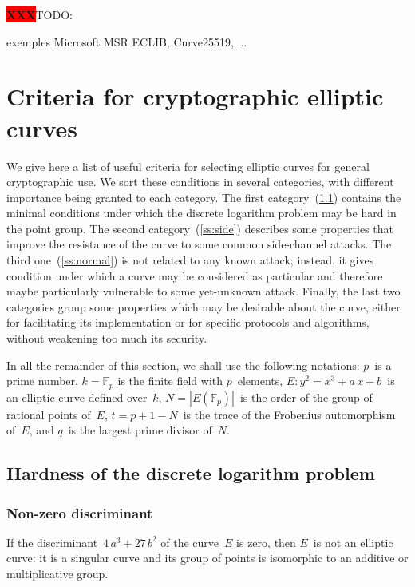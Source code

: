 \documentclass{article}
\def\F{\mathbb{F}}
\def\abs#1{\left|#1\right|}
\def\XXX{{\colorbox{red}{{\color{white}\bfseries XXX}}}}
\begin{document}
\sloppy

\XXX TODO:

exemples Microsoft MSR ECLIB, Curve25519, ...

\section{Criteria for cryptographic elliptic curves}
\label{s:criteria}

We give here a list of useful criteria for selecting elliptic curves
for general cryptographic use.
We sort these conditions in several categories,
with different importance being granted to each category.
The first category~(\ref{ss:dlp}) contains the minimal conditions under which
the discrete logarithm problem may be hard in the point group.
The second category~(\ref{ss:side}) describes some properties that improve
the resistance of the curve to some common side-channel attacks.
The third one~(\ref{ss:normal}) is not related to any known attack;
instead, it gives condition under which a curve may be considered
as particular and therefore maybe particularly vulnerable
to some yet-unknown attack.
Finally, the last two categories group some properties
which may be desirable about the curve,
either for facilitating its implementation
or for specific protocols and algorithms,
without weakening too much its security.

In all the remainder of this section,
we shall use the following notations:
$p$~is a prime number,
$k = \F_{p}$ is the finite field with $p$~elements,
$E: y^2 = x^3 + a\,x + b$~is an elliptic curve defined over~$k$,
$N = \abs{E(\F_p)}$~is the order of the group of rational points of~$E$,
$t = p + 1 - N$~is the trace of the Frobenius automorphism of~$E$,
and $q$~is the largest prime divisor of~$N$.


\subsection{Hardness of the discrete logarithm problem}
\label{ss:dlp}
\subsubsection{Non-zero discriminant}

If the discriminant~$4\, a^3 + 27\,b^2$
of the curve~$E$ is zero, then $E$~is not an elliptic curve:
it is a singular curve and its group of points is isomorphic to
an additive or multiplicative group.
\end{document}
